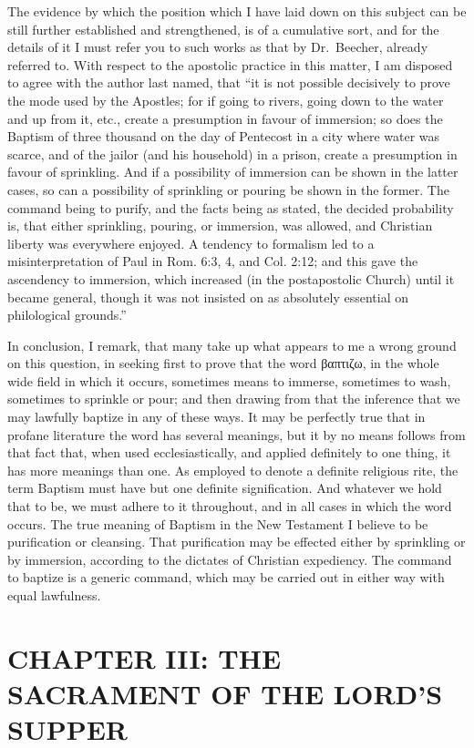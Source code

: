 \documentclass[]{book}
\begin{document}
The evidence by which the position which I have laid down on this subject can be still further established and strengthened, is of a cumulative sort, and for the details of it I must refer you to such works as that by Dr.~Beecher, already referred to. With respect to the apostolic practice in this matter, I am disposed to agree with the author last named, that ``it is not possible decisively to prove the mode used by the Apostles; for if going to rivers, going down to the water and up from it, etc., create a presumption in favour of immersion; so does the Baptism of three thousand on the day of Pentecost in a city where water was scarce, and of the jailor (and his household) in a prison, create a presumption in favour of sprinkling. And if a possibility of immersion can be shown in the latter cases, so can a possibility of sprinkling or pouring be shown in the former. The command being to purify, and the facts being as stated, the decided probability is, that either sprinkling, pouring, or immersion, was allowed, and Christian liberty was everywhere enjoyed. A tendency to formalism led to a misinterpretation of Paul in Rom. 6:3, 4, and Col. 2:12; and this gave the ascendency to immersion, which increased (in the postapostolic Church) until it became general, though it was not insisted on as absolutely essential on philological grounds.''

In conclusion, I remark, that many take up what appears to me a wrong ground on this question, in seeking first to prove that the word βαπτιζω, in the whole wide field in which it occurs, sometimes means to immerse, sometimes to wash, sometimes to sprinkle or pour; and then drawing from that the inference that we may lawfully baptize in any of these ways. It may be perfectly true that in profane literature the word has several meanings, but it by no means follows from that fact that, when used ecclesiastically, and applied definitely to one thing, it has more meanings than one. As employed to denote a definite religious rite, the term Baptism must have but one definite signification. And whatever we hold that to be, we must adhere to it throughout, and in all cases in which the word occurs. The true meaning of Baptism in the New Testament I believe to be purification or cleansing. That purification may be effected either by sprinkling or by immersion, according to the dictates of Christian expediency. The command to baptize is a generic command, which may be carried out in either way with equal lawfulness.

\hypertarget{chapter-iii-the-sacrament-of-the-lords-supper}{%
\chapter{CHAPTER III: THE SACRAMENT OF THE LORD'S SUPPER}\label{chapter-iii-the-sacrament-of-the-lords-supper}}
\end{document}
